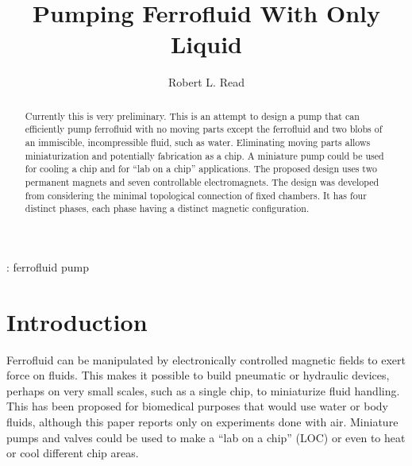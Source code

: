 \documentclass[12pt]{article}
\begin{document}

\title{Pumping Ferrofluid With Only Liquid}

\maketitle

\author{Robert L. Read}

\begin{abstract}

  Currently this is very preliminary. This is an attempt to design a pump that can efficiently pump ferrofluid with no moving parts
  except the ferrofluid and two blobs of an immiscible, incompressible fluid, such as water.
  Eliminating moving parts allows miniaturization and potentially fabrication as a chip.
  A miniature pump could be used for cooling a chip and for ``lab on a chip'' applications.
  The proposed design uses two permanent magnets and seven controllable electromagnets.
  The design was developed from considering the minimal topological connection of fixed chambers.
  It has four distinct phases, each phase having a distinct magnetic configuration.
\end{abstract}

%
\vspace{2pc}
: ferrofluid pump

%
%


\section{Introduction}

Ferrofluid can be manipulated by electronically controlled magnetic
fields to exert force on fluids\cite{torres2014recent,kole2021engineering,ozbey2015modeling}.
This makes it possible to build pneumatic or hydraulic
devices, perhaps on very small scales,
such as a single chip\cite{yamahata2003ferrofluid,hatch2001ferrofluidic}, to
miniaturize fluid handling.
This has been proposed for biomedical purposes\cite{michelson2019novel}
that would use water or body fluids,
although this paper reports only on experiments done with air.
Miniature pumps and valves could be used to make a “lab on a chip” (LOC) or
even to heat or cool different chip areas.
\end{document}
